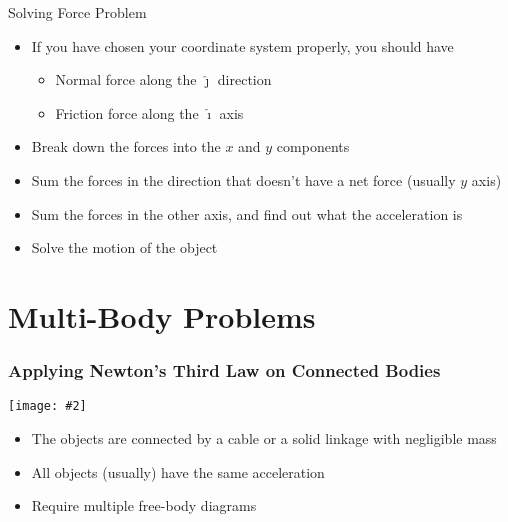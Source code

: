 \documentclass[12pt,compress,aspectratio=169]{beamer}
\newcommand{\pic}[2]{\texttt{[image: \#2]}}
\begin{document}
\begin{frame}{Solving Force Problem}
  \begin{itemize}
  \item If you have chosen your coordinate system properly, you should have
    \begin{itemize}
    \item Normal force along the $\bm{\hat{\jmath}}$ direction
    \item Friction force along the $\bm{\hat{\imath}}$ axis      
    \end{itemize}
  \item Break down the forces into the $x$ and $y$ components
  \item Sum the forces in the direction that doesn't have a net force (usually
    $y$ axis)
  \item Sum the forces in the other axis, and find out what the acceleration is
  \item Solve the motion of the object
  \end{itemize}
\end{frame}


%
%



\section{Multi-Body Problems}

\begin{frame}
  \frametitle{Applying Newton's Third Law on Connected Bodies}
  \begin{center}
    \pic{.7}{graphics/worldslongestroadtrainwithpowertrailer8.jpg}
  \end{center}
  \begin{itemize}
  \item The objects are connected by a cable or a solid linkage with negligible
    mass
  \item All objects (usually) have the same acceleration
  \item Require multiple free-body diagrams
  \end{itemize}
\end{frame}
\end{document}
